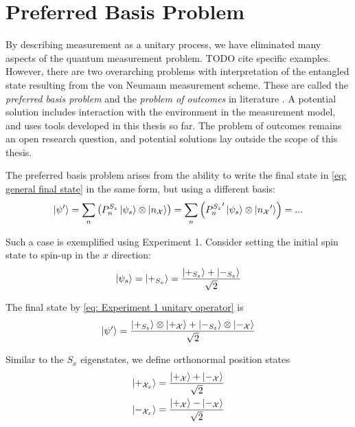 \section{Preferred Basis Problem}

By describing measurement as a unitary process, we have eliminated many aspects of the quantum measurement problem. TODO cite specific examples. However, there are two overarching problems with interpretation of the entangled state resulting from the von Neumann measurement scheme. These are called the \textit{preferred basis problem} and the \textit{problem of outcomes} in literature \cite{Schlosshauer}\cite{Wang}. A potential solution includes interaction with the environment in the measurement model, and uses tools developed in this thesis so far. The problem of outcomes remains an open research question, and potential solutions lay outside the scope of this thesis.

The preferred basis problem arises from the ability to write the final state in \autoref{eq: general final state} in the same form, but using a different basis:
\begin{align}  \label{eq: preferred basis state general}
  \ket{\psi'} = \sum_{n}\left(P^{S_z}_n\ket{\psi_s} \otimes \ket{n_\mathcal{X}}\right) = \sum_{n}\left({P^{S_z}_{n}}' \ket{\psi_s} \otimes \ket{{n_\mathcal{X}}'}\right) =...
\end{align}

Such a case is exemplified using Experiment 1. Consider setting the initial spin state to spin-up in the $x$ direction:
\begin{align}
  \ket{\psi_s} = \ket{+_{S_x}} = \frac{\ket{+_{S_z}} + \ket{-_{S_z}}}{\sqrt{2}}
\end{align}

The final state by \autoref{eq: Experiment 1 unitary operator} is
\begin{align} \label{eq:preferred basis state z}
  \ket{\psi'} = \frac{\ket{+_{S_z}}\otimes\ket{+_{\mathcal{X}}} + \ket{-_{S_z}}\otimes\ket{-_{\mathcal{X}}}}{\sqrt{2}}
\end{align}

Similar to the $S_x$ eigenstates, we define orthonormal position states
\begin{align}
  \ket{+_{\mathcal{X}_x}} = \frac{\ket{+_{\mathcal{X}}} + \ket{-_{\mathcal{X}}}}{\sqrt{2}} \\ \nonumber
  \ket{-_{\mathcal{X}_x}} = \frac{\ket{+_{\mathcal{X}}} - \ket{-_{\mathcal{X}}}}{\sqrt{2}}
\end{align}

